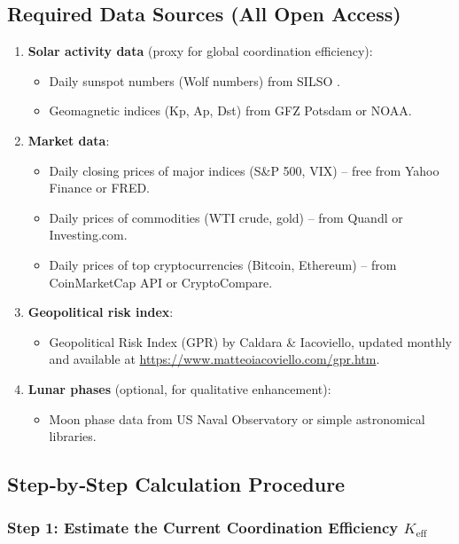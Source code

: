 \documentclass[11pt,a4paper]{article}
\theoremstyle{remark}
\begin{document}
	\subsection{Required Data Sources (All Open Access)}
	
	\begin{enumerate}
		\item \textbf{Solar activity data} (proxy for global coordination efficiency):
		\begin{itemize}
			\item Daily sunspot numbers (Wolf numbers) from SILSO \cite{SILSO}.
			\item Geomagnetic indices (Kp, Ap, Dst) from GFZ Potsdam or NOAA.
		\end{itemize}
		\item \textbf{Market data}:
		\begin{itemize}
			\item Daily closing prices of major indices (S\&P 500, VIX) – free from Yahoo Finance or FRED.
			\item Daily prices of commodities (WTI crude, gold) – from Quandl or Investing.com.
			\item Daily prices of top cryptocurrencies (Bitcoin, Ethereum) – from CoinMarketCap API or CryptoCompare.
		\end{itemize}
		\item \textbf{Geopolitical risk index}:
		\begin{itemize}
			\item Geopolitical Risk Index (GPR) by Caldara \& Iacoviello, updated monthly and available at \url{https://www.matteoiacoviello.com/gpr.htm}.
		\end{itemize}
		\item \textbf{Lunar phases} (optional, for qualitative enhancement):
		\begin{itemize}
			\item Moon phase data from US Naval Observatory or simple astronomical libraries.
		\end{itemize}
	\end{enumerate}
	
	\subsection{Step‑by‑Step Calculation Procedure}
	
	\subsubsection{Step 1: Estimate the Current Coordination Efficiency \(K_{\mathrm{eff}}\)}
	
\end{document}
